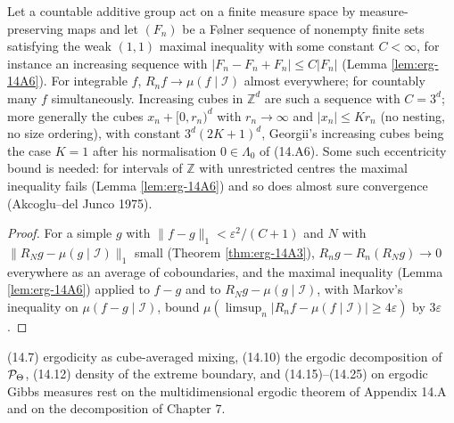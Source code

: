\begin{theorem}
    \label{thm:erg-14A8}
    \leanok

    Let a countable additive group act on a finite measure space by measure-preserving maps and
    let $(F_n)$ be a F\o lner sequence of nonempty finite sets satisfying the weak $(1,1)$
    maximal inequality with some constant $C < \infty$, for instance an increasing sequence
    with $|F_n - F_n + F_n| \le C|F_n|$ (Lemma \ref{lem:erg-14A6}). For integrable $f$,
    $R_n f \to \mu(f \mid \mathcal{I})$ almost everywhere; for countably many $f$ simultaneously.
    Increasing cubes in $\mathbb{Z}^d$ are such a sequence with $C = 3^d$; more generally the
    cubes $x_n + [0, r_n)^d$ with $r_n \to \infty$ and $|x_n| \le K r_n$ (no nesting, no size
    ordering), with constant $3^d(2K+1)^d$, Georgii's increasing cubes being the case $K = 1$
    after his normalisation $0 \in \Lambda_0$ of (14.A6). Some such eccentricity bound is
    needed: for intervals of $\mathbb Z$ with unrestricted centres the maximal inequality
    fails (Lemma \ref{lem:erg-14A6}) and so does almost sure convergence
    (Akcoglu--del Junco 1975).
\end{theorem}
\begin{proof}
    \leanok

    For a simple $g$ with $\|f - g\|_1 < \varepsilon^2/(C+1)$ and $N$ with
    $\|R_N g - \mu(g\mid\mathcal{I})\|_1$ small (Theorem \ref{thm:erg-14A3}),
    $R_n g - R_n(R_N g) \to 0$ everywhere as an average of coboundaries, and the maximal
    inequality (Lemma \ref{lem:erg-14A6}) applied to $f - g$ and to $R_N g - \mu(g\mid\mathcal{I})$,
    with Markov's inequality on $\mu(f - g \mid \mathcal{I})$, bound
    $\mu(\limsup_n |R_n f - \mu(f\mid\mathcal{I})| \ge 4\varepsilon)$ by $3\varepsilon$.
\end{proof}

\begin{remark}
    \label{rmk:erg-145bc}

    (14.7) ergodicity as cube-averaged mixing, (14.10) the ergodic decomposition of
    $\mathcal{P}_\Theta$, (14.12) density of the extreme boundary, and (14.15)--(14.25) on ergodic
    Gibbs measures rest on the multidimensional ergodic theorem of Appendix 14.A and on the
    decomposition of Chapter 7.
\end{remark}
